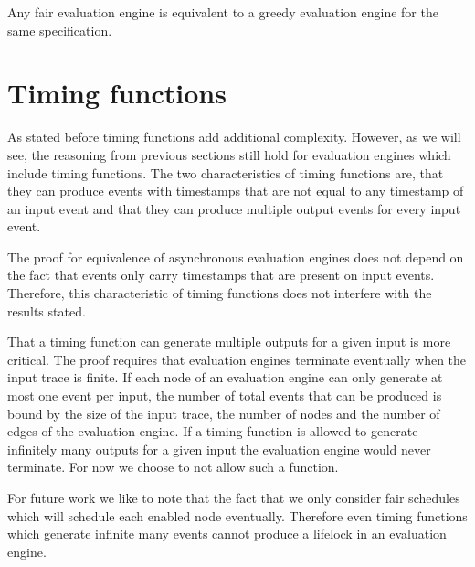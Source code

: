 \begin{theorem}[name = Equivalence of Fair and Greedy Evaluation Engines]\label{theorem:equivalence_greedy_fair_engines}
  Any fair evaluation engine is equivalent to a greedy evaluation engine for the same specification.
\end{theorem}

\section{Timing functions}
\label{sec:behaviours:timing_functions}

As stated before timing functions add additional complexity.
However, as we will see, the reasoning from previous sections still hold for evaluation engines which include timing functions.
The two characteristics of timing functions are, that they can produce events with timestamps that are not equal to any timestamp of an input event and that they can produce multiple output events for every input event.

The proof for equivalence of asynchronous evaluation engines does not depend on the fact that events only carry timestamps that are present on input events.
Therefore, this characteristic of timing functions does not interfere with the results stated.

That a timing function can generate multiple outputs for a given input is more critical.
The proof requires that evaluation engines terminate eventually when the input trace is finite.
If each node of an evaluation engine can only generate at most one event per input, the number of total events that can be produced is bound by the size of the input trace, the number of nodes and the number of edges of the evaluation engine.
If a timing function is allowed to generate infinitely many outputs for a given input the evaluation engine would never terminate.
For now we choose to not allow such a function.

For future work we like to note that the fact that we only consider fair schedules which will schedule each enabled node eventually.
Therefore even timing functions which generate infinite many events cannot produce a lifelock in an evaluation engine.
